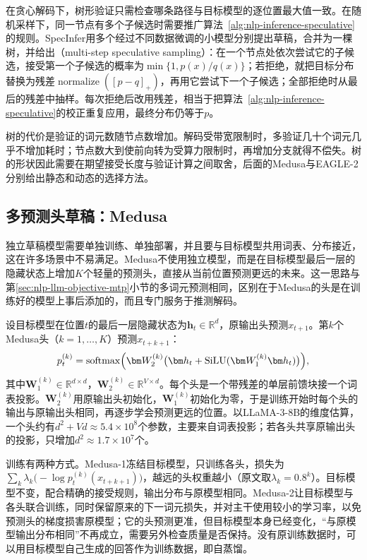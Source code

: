 在贪心解码下，树形验证只需检查哪条路径与目标模型的逐位置最大值一致。在随机采样下，同一节点有多个子候选时需要推广算法~\ref{alg:nlp-inference-speculative}的规则。SpecInfer用多个经过不同数据微调的小模型分别提出草稿，合并为一棵树，并给出（multi-step speculative sampling）\cite{nlp-inference-miao2024specinfer}：在一个节点处依次尝试它的子候选，接受第一个子候选的概率为$\min\{1,p(x)/q(x)\}$；若拒绝，就把目标分布替换为残差$\operatorname{normalize}([p-q]_+)$，再用它尝试下一个子候选；全部拒绝时从最后的残差中抽样。每次拒绝后改用残差，相当于把算法~\ref{alg:nlp-inference-speculative}的校正重复应用，最终分布仍等于$p$。

树的代价是验证的词元数随节点数增加。解码受带宽限制时，多验证几十个词元几乎不增加耗时；节点数大到使前向转为受算力限制时，再增加分支就得不偿失。树的形状因此需要在期望接受长度与验证计算之间取舍，后面的Medusa与EAGLE-2分别给出静态和动态的选择方法。

\subsection{多预测头草稿：Medusa}
\label{sec:nlp-inference-multihead}

独立草稿模型需要单独训练、单独部署，并且要与目标模型共用词表、分布接近，这在许多场景中不易满足。Medusa不使用独立模型，而是在目标模型最后一层的隐藏状态上增加$K$个轻量的预测头，直接从当前位置预测更远的未来。这一思路与第\ref{sec:nlp-llm-objective-mtp}小节的多词元预测相同，区别在于Medusa的头是在训练好的模型上事后添加的，而且专门服务于推测解码。

设目标模型在位置$t$的最后一层隐藏状态为$\bm h_t\in\mathbb R^{d}$，原输出头预测$x_{t+1}$。第$k$个Medusa头（$k=1,\ldots,K$）预测$x_{t+k+1}$：
\begin{equation}
 p^{(k)}_t=\operatorname{softmax}\Bigl(\bm W^{(k)}_2\bigl(\bm h_t+\operatorname{SiLU}(\bm W^{(k)}_1\bm h_t)\bigr)\Bigr),
 \label{eq:nlp-inference-medusa-head}
\end{equation}
其中$\bm W^{(k)}_1\in\mathbb R^{d\times d}$，$\bm W^{(k)}_2\in\mathbb R^{V\times d}$。每个头是一个带残差的单层前馈块接一个词表投影。$\bm W^{(k)}_2$用原输出头初始化，$\bm W^{(k)}_1$初始化为零，于是训练开始时每个头的输出与原输出头相同，再逐步学会预测更远的位置。以LLaMA-3-8B的维度估算，一个头约有$d^2+Vd\approx5.4\times10^8$个参数，主要来自词表投影；若各头共享原输出头的投影，只增加$d^2\approx1.7\times10^7$个。

训练有两种方式。Medusa-1冻结目标模型，只训练各头，损失为$\sum_k\lambda_k\bigl(-\log p^{(k)}_t(x_{t+k+1})\bigr)$，越远的头权重越小（原文取$\lambda_k=0.8^k$）。目标模型不变，配合精确的接受规则，输出分布与原模型相同。Medusa-2让目标模型与各头联合训练，同时保留原来的下一词元损失，并对主干使用较小的学习率，以免预测头的梯度损害原模型；它的头预测更准，但目标模型本身已经变化，“与原模型输出分布相同”不再成立，需要另外检查质量是否保持。没有原训练数据时，可以用目标模型自己生成的回答作为训练数据，即自蒸馏。

